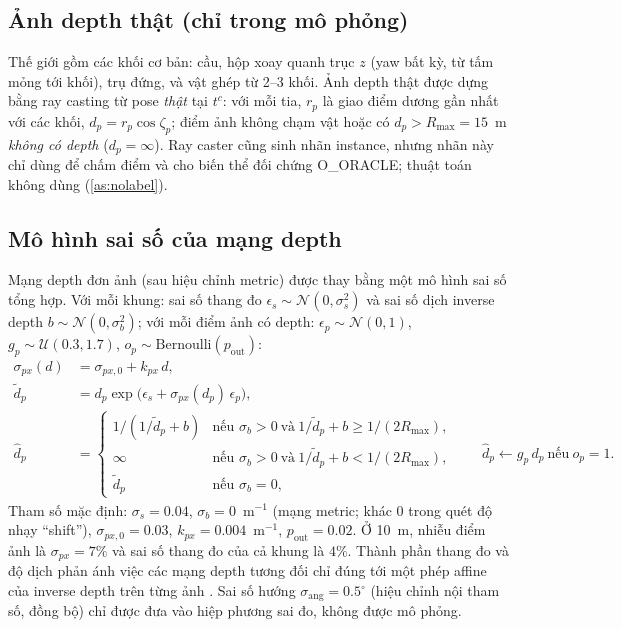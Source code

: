 \documentclass[11pt,a4paper]{article}
\numberwithin{equation}{section}
\theoremstyle{definition}
\theoremstyle{plain}
\theoremstyle{remark}
\begin{document}
\subsection{Ảnh depth thật (chỉ trong mô phỏng)}
Thế giới gồm các khối cơ bản: cầu, hộp xoay quanh trục $z$ (yaw bất kỳ, từ tấm mỏng tới khối), trụ đứng, và vật ghép từ 2--3 khối. Ảnh depth thật được dựng bằng ray casting từ pose \emph{thật} tại $t^c$: với mỗi tia, $r_p$ là giao điểm dương gần nhất với các khối, $d_p=r_p\cos\zeta_p$; điểm ảnh không chạm vật hoặc có $d_p>R_{\max}=15$~m \emph{không có depth} ($d_p=\infty$). Ray caster cũng sinh nhãn instance, nhưng nhãn này chỉ dùng để chấm điểm và cho biến thể đối chứng O\_ORACLE; thuật toán không dùng (\ref{as:nolabel}).

\subsection{Mô hình sai số của mạng depth}
\label{sec:depthmodel}
Mạng depth đơn ảnh (sau hiệu chỉnh metric) được thay bằng một mô hình sai số tổng hợp. Với mỗi khung: sai số thang đo $\epsilon_s\sim\mathcal N(0,\sigma_s^2)$ và sai số dịch inverse depth $b\sim\mathcal N(0,\sigma_b^2)$; với mỗi điểm ảnh có depth: $\epsilon_p\sim\mathcal N(0,1)$, $g_p\sim\mathcal U(0.3,1.7)$, $o_p\sim\text{Bernoulli}(p_{\text{out}})$:
\begin{align}
\sigma_{px}(d)&=\sigma_{px,0}+k_{px}\,d, \label{eq:sigpx}\\
\tilde d_p&=d_p\exp\!\big(\epsilon_s+\sigma_{px}(d_p)\,\epsilon_p\big), \label{eq:depthnoise}\\
\hat d_p&=\begin{cases}
1/(1/\tilde d_p+b) & \text{nếu }\sigma_b>0\ \text{và}\ 1/\tilde d_p+b\ge1/(2R_{\max}),\\
\infty & \text{nếu }\sigma_b>0\ \text{và}\ 1/\tilde d_p+b<1/(2R_{\max}),\\
\tilde d_p & \text{nếu }\sigma_b=0,
\end{cases}\qquad
\hat d_p\leftarrow g_p\,d_p\ \text{nếu}\ o_p=1. \label{eq:shift}
\end{align}
Tham số mặc định: $\sigma_s=0.04$, $\sigma_b=0$~m$^{-1}$ (mạng metric; khác 0 trong quét độ nhạy ``shift''), $\sigma_{px,0}=0.03$, $k_{px}=0.004$~m$^{-1}$, $p_{\text{out}}=0.02$. Ở 10~m, nhiễu điểm ảnh là $\sigma_{px}=7\%$ và sai số thang đo của cả khung là $4\%$. Thành phần thang đo và độ dịch phản ánh việc các mạng depth tương đối chỉ đúng tới một phép affine của inverse depth trên từng ảnh \cite{ranftl2022,yang2024dav2}. Sai số hướng $\sigma_{\text{ang}}=0.5^\circ$ (hiệu chỉnh nội tham số, đồng bộ) chỉ được đưa vào hiệp phương sai đo, không được mô phỏng.
\end{document}
